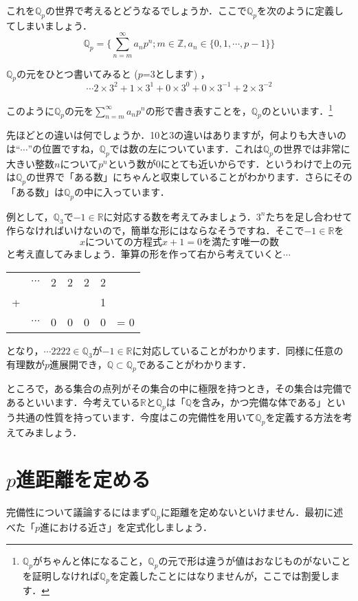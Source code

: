 \documentclass[./main]{subfiles}
\theoremstyle{definition}
\newcommand{\Z}{\mathbb{Z}}%
\newcommand{\Q}{\mathbb{Q}}%
\newcommand{\Qp}{\mathbb{Q}_p}%
\newcommand{\R}{\mathbb{R}}%
\begin{document}
これを$\Qp$の世界で考えるとどうなるでしょうか．ここで$\Qp$を次のように定義してしまいましょう．
\[
\Qp=\bigl\{ \sum^\infty_{n=m} a_n p^n ; m\in \Z , a_n \in \{ 0,1,\cdots ,p-1\} \bigr\}
\]

$\Qp$の元をひとつ書いてみると ($p$=3とします) ，
\[
\cdots2 \times 3^2 + 1 \times 3^1 + 0 \times 3^0 + 0\times 3^{-1} + 2 \times 3^{-2}
\]

このように$\Qp$の元を$\sum^\infty_{n=m} a_n p^n$の形で書き表すことを，$\Qp$のといいます．\footnote{$\Qp$がちゃんと体になること，$\Qp$の元で形は違うが値はおなじものがないことを証明しなければ$\Qp$を定義したことにはなりませんが，ここでは割愛します．}

先ほどとの違いは何でしょうか．10と3の違いはありますが，何よりも大きいのは``$\cdots$''の位置ですね，$\Qp$では数の左についています．これは$\Qp$の世界では非常に大きい整数$n$について$p^n$という数が0にとても近いからです．というわけで上の元は$\Qp$の世界で「ある数」にちゃんと収束していることがわかります．さらにその「ある数」は$\Qp$の中に入っています．

例として，$\Q_3$で$-1\in\R$に対応する数を考えてみましょう．$3^n$たちを足し合わせて作らなければいけないので，簡単な形にはならなそうですね．そこで$-1\in\R$を
\[
xについての方程式 x+1=0 を満たす唯一の数
\]
と考え直してみましょう．筆算の形を作って右から考えていくと$\cdots$

\begin{center}
\begin{tabular}{ccccccr}
	 &$\cdots$&2&2&2&2& \\ 
	+& & & & &1& \\ \cline{1-6} 
	 &$\cdots$&0&0&0&0& = 0\\
\end{tabular}
\end{center}

となり，$\cdots 2222\in \Q_3$が$-1\in\R$に対応していることがわかります．同様に任意の有理数が$p$進展開でき，$\Q \subset \Qp$であることがわかります．

ところで，ある集合の点列がその集合の中に極限を持つとき，その集合は完備であるといいます．今考えている$\R$と$\Qp$は「$\Q$を含み，かつ完備な体である」という共通の性質を持っています．今度はこの完備性を用いて$\Qp$を定義する方法を考えてみましょう．

\section{$p$進距離を定める}

完備性について議論するにはまず$\Qp$に距離を定めないといけません．最初に述べた「$p$進における近さ」を定式化しましょう．
\end{document}
